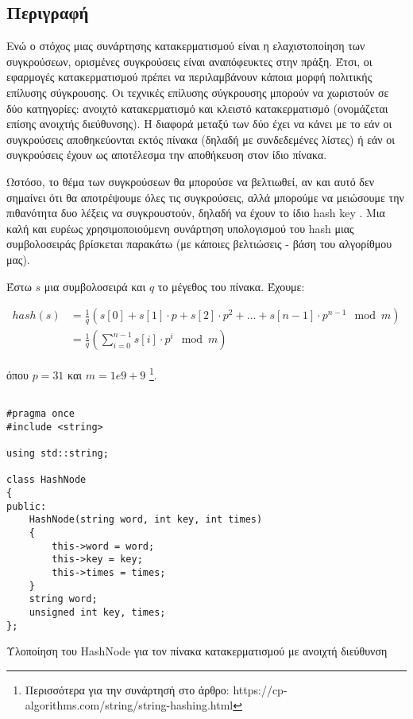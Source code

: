 \subsection*{Περιγραφή}

Ενώ ο στόχος μιας συνάρτησης κατακερματισμού είναι η ελαχιστοποίηση των συγκρούσεων, ορισμένες συγκρούσεις είναι αναπόφευκτες στην πράξη. Έτσι, οι εφαρμογές κατακερματισμού πρέπει να περιλαμβάνουν κάποια μορφή πολιτικής επίλυσης σύγκρουσης. Οι τεχνικές επίλυσης σύγκρουσης μπορούν να χωριστούν σε δύο κατηγορίες: ανοιχτό κατακερματισμό και κλειστό κατακερματισμό (ονομάζεται επίσης ανοιχτής διεύθυνσης). Η διαφορά μεταξύ των δύο έχει να κάνει με το εάν οι συγκρούσεις αποθηκεύονται εκτός πίνακα (δηλαδή με συνδεδεμένες λίστες) ή εάν οι συγκρούσεις έχουν ως αποτέλεσμα την αποθήκευση στον ίδιο πίνακα.

Ωστόσο, το θέμα των συγκρούσεων θα μπορούσε να βελτιωθεί, αν και αυτό δεν σημαίνει ότι θα αποτρέψουμε όλες τις συγκρούσεις, αλλά μπορούμε να μειώσουμε την πιθανότητα δυο λέξεις να συγκρουστούν, δηλαδή να έχουν το ίδιο \en hash key \gr. Μια καλή και ευρέως χρησιμοποιούμενη συνάρτηση υπολογισμού του \en hash \gr μιας συμβολοσειράς βρίσκεται παρακάτω (με κάποιες βελτιώσεις - βάση του αλγορίθμου μας).

\bigskip

\noindent Έστω $s$ μια συμβολοσειρά και $q$ το μέγεθος του πίνακα. Έχουμε:

\begin{align*}
    hash(s) &= \frac{1}{q} \left( s[0] + s[1] \cdot p + s[2] \cdot p^2 + \ldots + s[n-1] \cdot p^{n-1} \mod m \right) \\
    &=  \frac{1}{q} \left( \sum_{i=0}^{n-1} s[i] \cdot p^i \mod m \right)
\end{align*}

\noindent όπου $p = 31$ και $m = 1e9 + 9$ \footnote[1]{Περισσότερα για την συνάρτησή στο άρθρο: \en https://cp-algorithms.com/string/string-hashing.html \gr }.

\bigskip

\en
\begin{listing}[ht]
\begin{verbatim}

#pragma once
#include <string>

using std::string;

class HashNode
{
public:
    HashNode(string word, int key, int times)
    {
        this->word = word;
        this->key = key;
        this->times = times;
    }
    string word;
    unsigned int key, times;
};

\end{verbatim}
\caption{Υλοποίηση του \en HashNode \gr για τον πίνακα κατακερματισμού με ανοιχτή διεύθυνση}
\label{listing:9}
\end{listing}
\gr

